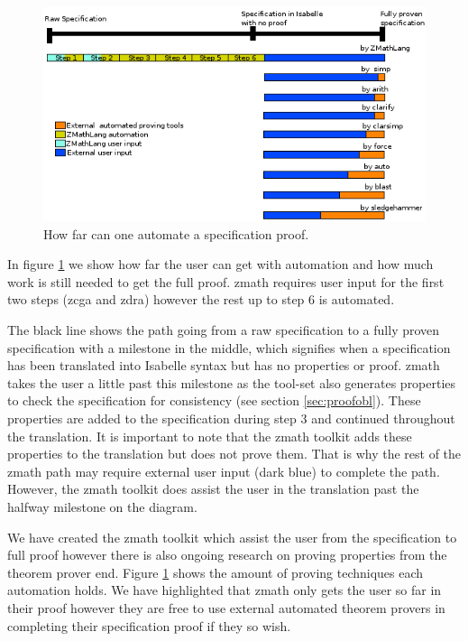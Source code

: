 \begin{figure}[H]
 \begin{center}
 \includegraphics [scale=0.75]{Figures/Design/timeline.png}
 \caption{How far can one automate a specification proof.}
 \label{fig:timeline}
\end{center}
\end{figure} 

In figure \ref{fig:timeline} we show how far the user can get with automation
and how much work is still needed to get the full proof. \Gls{zmath} requires
user input for the first two steps (\gls{zcga} and \gls{zdra}) however the rest
up to step 6 is automated.

The black line shows the path going from a raw specification to a fully proven
specification with a milestone in the middle, which signifies when a
specification has been translated into Isabelle syntax but has no properties or
proof. \Gls{zmath} takes the user a little past this milestone as the tool-set
also generates properties to check the specification for consistency (see
section \ref{sec:proofobl}). These properties are added to the specification
during step 3 and continued throughout the translation. It is important to note
that the \gls{zmath} toolkit adds these properties to the translation but does
not prove them. That is why the rest of the \gls{zmath} path may require
external user input (dark blue) to complete the path. However, the \gls{zmath}
toolkit does assist the user in the translation past the halfway milestone on
the diagram.

We have created the \Gls{zmath} toolkit which assist the user from the
specification to full proof however there is also ongoing research on proving
properties from the theorem prover end. Figure \ref{fig:timeline} shows the
amount of proving techniques each automation holds. We have highlighted that
\gls{zmath} only gets the user so far in their proof however they are free to
use external automated theorem provers in completing their specification proof
if they so wish.


